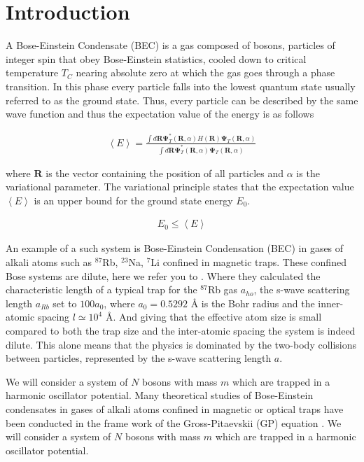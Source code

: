 \section{Introduction}

A Bose-Einstein Condensate (BEC) is a gas composed of bosons, particles of integer spin that obey Bose-Einstein statistics, cooled down to critical temperature $T_C$ nearing absolute zero at which the gas goes through a phase transition. In this phase every particle falls into the lowest quantum state usually referred to as the ground state. Thus, every particle can be described by the same wave function and thus the expectation value of the energy is as follows

\begin{align}
    \left\langle E \right\rangle = \frac{\int d\mathbf{R} \mathbf{\Psi}_T^*(\mathbf{R},\alpha) H(\mathbf{R}) \mathbf{\Psi}_T(\mathbf{R},\alpha)}{\int d\mathbf{R} \mathbf{\Psi}_T^*(\mathbf{R},\alpha)\mathbf{\Psi}_T(\mathbf{R},\alpha)}
    \label{eq:energy-expectation-value}
\end{align}

where $\mathbf{R}$ is the vector containing the position of all particles and $\alpha$ is the variational parameter. The variational principle states that the expectation value $\left\langle E \right\rangle$ is an upper bound for the ground state energy $E_0$.

\begin{align}
    E_0 \leq \left\langle E \right\rangle
\end{align}

An example of a such system is Bose-Einstein Condensation (BEC) in gases of alkali atoms such as $^{87}$Rb, $^{23}$Na, $^{7}$Li confined in magnetic traps. These confined Bose systems are dilute, here we refer you to \cite{DuBois-Glyde01}. Where they calculated the  characteristic length of a typical trap for the $^{87}$Rb gas $a_{ho}$, the s-wave scattering length $a_{Rb}$ set to $100a_0$, where $a_0 = 0.5292 \text{ \AA}$ is the Bohr radius and the inner-atomic spacing $l \simeq 10^4 \text{ \AA}$. And giving that the  effective atom size is small compared to both the trap size and the inter-atomic spacing the system is indeed dilute. This alone means that the physics is dominated by the two-body collisions between particles, represented by the s-wave scattering length $a$. 

We will consider a system of $N$ bosons with mass $m$ which are trapped in a harmonic oscillator potential. Many theoretical studies of Bose-Einstein condensates in gases of alkali atoms confined in magnetic or optical traps have been conducted in the frame work of the Gross-Pitaevskii (GP) equation \cite{Fab-Polls99}. We will consider a system of $N$ bosons with mass $m$ which are trapped in a harmonic oscillator potential.

